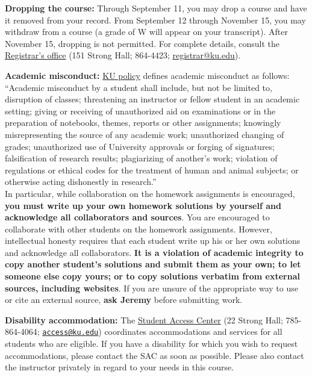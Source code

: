 \documentclass{amsart}
\newcommand{\Blue}{\color{blue}}
\newcommand{\indnt}{\phantom{\quad}}
\begin{document}
\textbf{Dropping the course:} Through September 11, you may drop a course and have it removed from your record.  From September 12 through November 15, you may withdraw from a course (a grade of W will appear on your transcript).  After November 15, dropping is not permitted.  For complete details, consult the \href{http://www.registrar.ku.edu}{\Blue Registrar's office} (151 Strong Hall; 864-4423; \href{mailto:registrar@ku.edu}{\Blue registrar@ku.edu}).

\textbf{Academic misconduct:}
  \href{http://policy.ku.edu/governance/USRR#art2sect6}{\Blue KU policy} defines academic misconduct as follows: ``Academic misconduct by a student shall include, but not be limited to, disruption of classes; threatening an instructor or fellow student in an academic setting; giving or receiving of unauthorized aid on examinations or in the preparation of notebooks, themes, reports or other assignments; knowingly misrepresenting the source of any academic work; unauthorized changing of grades; unauthorized use of University approvals or forging of signatures; falsification of research results; plagiarizing of another's work; violation of regulations or ethical codes for the treatment of human and animal subjects; or otherwise acting dishonestly in research.''\\
\indnt  In particular, while collaboration on the homework assignments is encouraged, \textbf{you must write up your own homework solutions by yourself and acknowledge all collaborators and sources}.  You are encouraged to collaborate with other students on the homework assignments.  However, intellectual honesty requires that each student write up his or her own solutions and acknowledge all collaborators.  \textbf{It is a violation of academic integrity to copy another student's solutions and submit them as your own; to let someone else copy yours; or to copy solutions verbatim from external sources, including websites}.  If you are unsure of the appropriate way to use or cite an external source, \textbf{ask Jeremy} before submitting work.

\textbf{Disability accommodation:}
  The \href{http://access.ku.edu/}{\Blue Student Access Center} (22 Strong Hall; 785-864-4064; \href{mailto:access@ku.edu}{\tt access@ku.edu}) coordinates accommodations and services for all students who are eligible.  If you have a disability for which you wish to request accommodations, please contact the SAC as soon as possible. Please also contact the instructor privately in regard to your needs in this
course.
\end{document}
